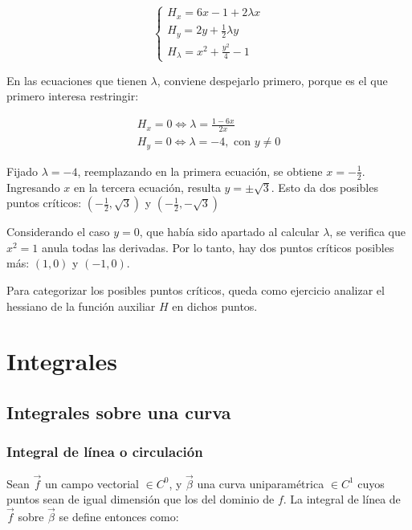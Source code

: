 \documentclass{article}
\begin{document}
\begin{equation}
\left\{
\begin{array}{ll}
H_x = 6 x - 1 + 2 \lambda x \\
H_y = 2 y + \frac{1}{2} \lambda y \\
H_{\lambda} = x^2 + \frac{y^2}{4} - 1
\end{array}
\right.
\end{equation}

En las ecuaciones que tienen $\lambda$, conviene despejarlo primero, porque es el que primero interesa restringir:

\begin{equation}
\begin{array}{ll}
H_x = 0 \Leftrightarrow \lambda = \frac{1-6x}{2x} \\
H_y = 0 \Leftrightarrow \lambda = -4, \text{ con } y \neq 0
\end{array}
\end{equation}

Fijado $\lambda = -4$, reemplazando en la primera ecuación, se obtiene $x = -\frac{1}{2}$. Ingresando $x$ en la tercera ecuación, resulta $y = \pm \sqrt{3}$. Esto da dos posibles puntos críticos: $(-\frac{1}{2}, \sqrt{3})$ y $(-\frac{1}{2}, -\sqrt{3})$

Considerando el caso $y = 0$, que había sido apartado al calcular $\lambda$, se verifica que $x^2 = 1$ anula todas las derivadas. Por lo tanto, hay dos puntos críticos posibles más: $(1, 0)$ y $(-1, 0)$.

Para categorizar los posibles puntos críticos, queda como ejercicio analizar el hessiano de la función auxiliar $H$ en dichos puntos.

\section{Integrales}

\subsection{Integrales sobre una curva}

\subsubsection{Integral de línea o circulación}

Sean $\overrightarrow{f}$ un campo vectorial $\in C^0$, y $\overrightarrow{\beta}$ una curva uniparamétrica $\in C^1$ cuyos puntos sean de igual dimensión que los del dominio de $f$. La integral de línea de $\overrightarrow{f}$ sobre $\overrightarrow{\beta}$ se define entonces como:
\end{document}
